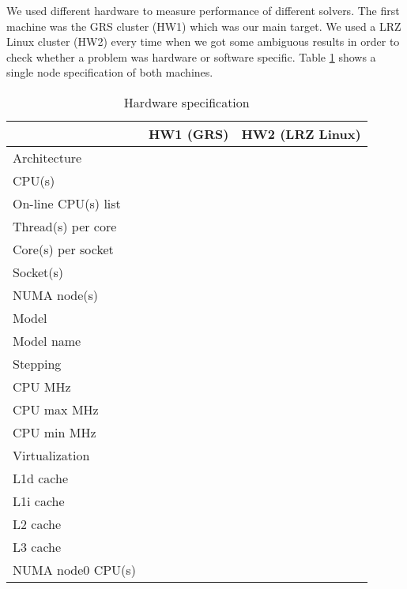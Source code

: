 We used different hardware to measure performance of different solvers. The first machine was the GRS cluster (HW1) which was our main target. We used a LRZ Linux cluster (HW2) every time when we got some ambiguous results in order to check whether a problem was hardware or software specific. Table \ref{table:hardware-spec} shows a single node specification of both machines. 


\begin{table}[ht]
\centering
\begin{tabular}{|l|l|l|}
\hline
                    & HW1 (GRS) & HW2 (LRZ Linux) \\ \hline
Architecture        &           &                 \\ \hline
CPU(s)              &           &                 \\ \hline
On-line CPU(s) list &           &                 \\ \hline
Thread(s) per core  &           &                 \\ \hline
Core(s) per socket  &           &                 \\ \hline
Socket(s)           &           &                 \\ \hline
NUMA node(s)        &           &                 \\ \hline
Model               &           &                 \\ \hline
Model name          &           &                 \\ \hline
Stepping            &           &                 \\ \hline
CPU MHz             &           &                 \\ \hline
CPU max MHz         &           &                 \\ \hline
CPU min MHz         &           &                 \\ \hline
Virtualization      &           &                 \\ \hline
L1d cache           &           &                 \\ \hline
L1i cache           &           &                 \\ \hline
L2 cache            &           &                 \\ \hline
L3 cache            &           &                 \\ \hline
NUMA node0 CPU(s)   &           &                 \\ \hline
\end{tabular}
\caption{Hardware specification}
\label{table:hardware-spec}
\end{table}

\newpage